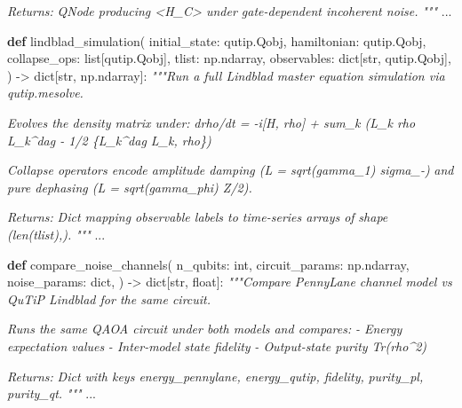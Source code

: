 \documentclass[
  11pt,
]{report}
\newenvironment{Shaded}{}{}
\newcommand{\BuiltInTok}[1]{\textcolor[rgb]{0.00,0.50,0.00}{#1}}
\newcommand{\CommentTok}[1]{\textcolor[rgb]{0.38,0.63,0.69}{\textit{#1}}}
\newcommand{\KeywordTok}[1]{\textcolor[rgb]{0.00,0.44,0.13}{\textbf{#1}}}
\newcommand{\NormalTok}[1]{#1}
\newcommand{\OperatorTok}[1]{\textcolor[rgb]{0.40,0.40,0.40}{#1}}
\begin{document}
\begin{Shaded}
\begin{Highlighting}[]
\CommentTok{    Returns:}
\CommentTok{        QNode producing \textless{}H\_C\textgreater{} under gate{-}dependent incoherent noise.}
\CommentTok{    """}
\NormalTok{    ...}


\KeywordTok{def}\NormalTok{ lindblad\_simulation(}
\NormalTok{    initial\_state: qutip.Qobj,}
\NormalTok{    hamiltonian: qutip.Qobj,}
\NormalTok{    collapse\_ops: }\BuiltInTok{list}\NormalTok{[qutip.Qobj],}
\NormalTok{    tlist: np.ndarray,}
\NormalTok{    observables: }\BuiltInTok{dict}\NormalTok{[}\BuiltInTok{str}\NormalTok{, qutip.Qobj],}
\NormalTok{) }\OperatorTok{{-}\textgreater{}} \BuiltInTok{dict}\NormalTok{[}\BuiltInTok{str}\NormalTok{, np.ndarray]:}
    \CommentTok{"""Run a full Lindblad master equation simulation via qutip.mesolve.}

\CommentTok{    Evolves the density matrix under:}
\CommentTok{        drho/dt = {-}i[H, rho] + sum\_k (L\_k rho L\_k\^{}dag {-} 1/2 \{L\_k\^{}dag L\_k, rho\})}

\CommentTok{    Collapse operators encode amplitude damping (L = sqrt(gamma\_1) sigma\_{-})}
\CommentTok{    and pure dephasing (L = sqrt(gamma\_phi) Z/2).}

\CommentTok{    Returns:}
\CommentTok{        Dict mapping observable labels to time{-}series arrays of}
\CommentTok{        shape (len(tlist),).}
\CommentTok{    """}
\NormalTok{    ...}


\KeywordTok{def}\NormalTok{ compare\_noise\_channels(}
\NormalTok{    n\_qubits: }\BuiltInTok{int}\NormalTok{,}
\NormalTok{    circuit\_params: np.ndarray,}
\NormalTok{    noise\_params: }\BuiltInTok{dict}\NormalTok{,}
\NormalTok{) }\OperatorTok{{-}\textgreater{}} \BuiltInTok{dict}\NormalTok{[}\BuiltInTok{str}\NormalTok{, }\BuiltInTok{float}\NormalTok{]:}
    \CommentTok{"""Compare PennyLane channel model vs QuTiP Lindblad for the same circuit.}

\CommentTok{    Runs the same QAOA circuit under both models and compares:}
\CommentTok{    {-} Energy expectation values}
\CommentTok{    {-} Inter{-}model state fidelity}
\CommentTok{    {-} Output{-}state purity Tr(rho\^{}2)}

\CommentTok{    Returns:}
\CommentTok{        Dict with keys \textquotesingle{}energy\_pennylane\textquotesingle{}, \textquotesingle{}energy\_qutip\textquotesingle{}, \textquotesingle{}fidelity\textquotesingle{},}
\CommentTok{        \textquotesingle{}purity\_pl\textquotesingle{}, \textquotesingle{}purity\_qt\textquotesingle{}.}
\CommentTok{    """}
\NormalTok{    ...}
\end{Highlighting}
\end{Shaded}
\end{document}
